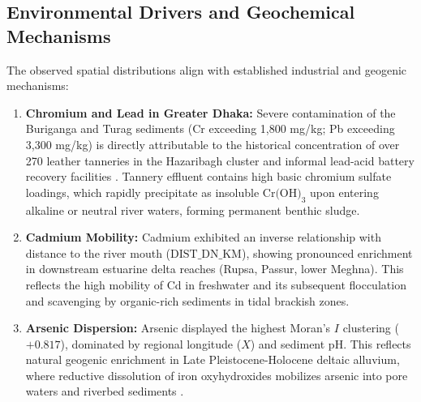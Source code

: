 \documentclass[authoryear,preprint,12pt]{elsarticle}
\begin{document}
\subsection{Environmental Drivers and Geochemical Mechanisms}
The observed spatial distributions align with established industrial and geogenic mechanisms:
\begin{enumerate}
    \item \textbf{Chromium and Lead in Greater Dhaka:} Severe contamination of the Buriganga and Turag sediments (Cr exceeding 1,800 mg/kg; Pb exceeding 3,300 mg/kg) is directly attributable to the historical concentration of over 270 leather tanneries in the Hazaribagh cluster and informal lead-acid battery recovery facilities \citep{Islam2018}. Tannery effluent contains high basic chromium sulfate loadings, which rapidly precipitate as insoluble $\text{Cr(OH)}_3$ upon entering alkaline or neutral river waters, forming permanent benthic sludge.
    \item \textbf{Cadmium Mobility:} Cadmium exhibited an inverse relationship with distance to the river mouth ($\text{DIST\_DN\_KM}$), showing pronounced enrichment in downstream estuarine delta reaches (Rupsa, Passur, lower Meghna). This reflects the high mobility of Cd in freshwater and its subsequent flocculation and scavenging by organic-rich sediments in tidal brackish zones.
    \item \textbf{Arsenic Dispersion:} Arsenic displayed the highest Moran's $I$ clustering ($+0.817$), dominated by regional longitude ($X$) and sediment pH. This reflects natural geogenic enrichment in Late Pleistocene-Holocene deltaic alluvium, where reductive dissolution of iron oxyhydroxides mobilizes arsenic into pore waters and riverbed sediments \citep{BGS2001}.
\end{enumerate}
\end{document}
